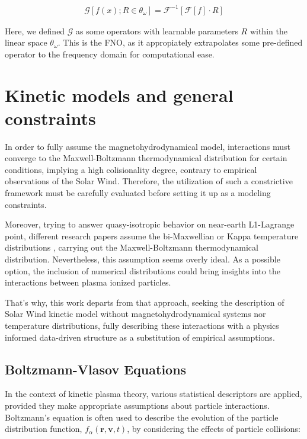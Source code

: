 \documentclass[12pt]{article}
\begin{document}
\begin{align*}
    \mathcal{G}[ f(x); R \in \theta_\omega] = \mathcal{F}^{-1}[\mathcal{F}[f] \cdot R]
\end{align*}

Here, we defined $\mathcal{G}$ as some operators with learnable parameters $R$ within the linear space $\theta_\omega$. This is the FNO, as it appropiately extrapolates some pre-defined operator to the frequency domain for computational ease.


\section{Kinetic models and general constraints}
In order to fully assume the magnetohydrodynamical model, interactions must converge to the Maxwell-Boltzmann thermodynamical distribution for certain conditions, implying a high colisionality degree, contrary to empirical observations of the Solar Wind. Therefore, the utilization of such a constrictive framework must be carefully evaluated before setting it up as a modeling constraints.

Moreover, trying to answer quasy-isotropic behavior on near-earth L1-Lagrange point, different research papers assume the bi-Maxwellian or Kappa temperature distributions \cite{Stansby_2018, Nicolaou_2018, Zouganelis_2004}, carrying out the Maxwell-Boltzmann thermodynamical distribution. Nevertheless, this assumption seems overly ideal. As a possible option, the inclusion of numerical distributions could bring insights into the interactions between plasma ionized particles.

That's why, this work departs from that approach, seeking the description of Solar Wind kinetic model without magnetohydrodynamical systems nor temperature distributions, fully describing these interactions with a physics informed data-driven structure as a substitution of empirical assumptions.

\subsection{Boltzmann-Vlasov Equations}

In the context of kinetic plasma theory, various statistical descriptors are applied, provided they make appropriate assumptions about particle interactions. Boltzmann's equation is often used to describe the evolution of the particle distribution function, $f_\alpha(\mathbf{r}, \mathbf{v}, t)$, by considering the effects of particle collisions:
\end{document}

